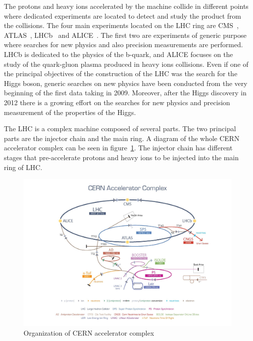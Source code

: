 The protons and heavy ions accelerated by the machine collide in different points where dedicated experiments are located to detect and study the product from the collisions. The four main experiments located on the LHC ring are CMS~\cite{Bayatian:922757,Bayatian:942733}, ATLAS~\cite{ATLAS:1999}, LHCb~\cite{Alves:2008zz} and ALICE~\cite{Cortese:879894}. The first two are experiments of generic purpose where searches for new physics and also precision measurements are performed. LHCb is dedicated to the physics of the b-quark, and ALICE focuses on the study of the quark-gluon plasma produced in heavy ions collisions. Even if one of the principal objectives of the construction of the LHC was the search for the Higgs boson, generic searches on new physics have been conducted from the very beginning of the first data taking in 2009. Moreover, after the Higgs discovery in 2012 there is a growing effort on the searches for new physics and precision measurement of the properties of the Higgs.

The LHC is a complex machine composed of several parts. The two principal parts are the injector chain and the main ring. A diagram of the whole CERN accelerator complex can be seen in figure~\ref{fig:Complex}. The injector chain has different stages that pre-accelerate protons and heavy ions to be injected into the main ring of LHC. %

\begin{figure}[!Hhtbp]
  \begin{center}
    \includegraphics[trim=4.5cm 0cm 0cm 0cm, clip=true, width=1.15\textwidth]{figs/cern-lhc-4.jpg}
    \caption{Organization of CERN accelerator complex}
    \label{fig:Complex}
  \end{center}
\end{figure}

